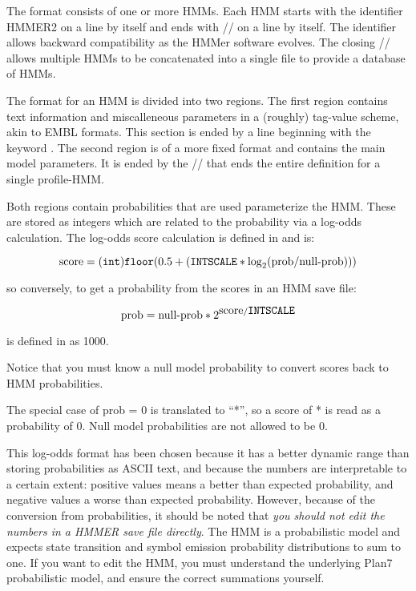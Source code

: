 The format consists of one or more HMMs. Each HMM starts with the
identifier HMMER2 on a line by itself and ends with // on a line by
itself. The identifier allows backward compatibility as the HMMer
software evolves. The closing // allows multiple HMMs to be
concatenated into a single file to provide a database of HMMs.

The format for an HMM is divided into two regions. The first region
contains text information and miscalleneous parameters in a (roughly)
tag-value scheme, akin to EMBL formats. This section is ended by a
line beginning with the keyword . The second region is of a
more fixed format and contains the main model parameters. It is ended
by the // that ends the entire definition for a single profile-HMM.

Both regions contain probabilities that are used parameterize the HMM.
These are stored as integers which are related to the probability via
a log-odds calculation. The log-odds score calculation is defined in
 and is:

\[
\mbox{score} = (\mbox{\texttt{int}}) \mbox{\texttt{floor}}(0.5 + (\mbox{\texttt{INTSCALE}} * \log_2(\mbox{prob}/\mbox{null-prob})))
\]

so conversely, to get a probability from the scores in an HMM save
file:

\[
\mbox{prob} = \mbox{null-prob} * 2^{\mbox{score}/\mbox{\texttt{INTSCALE}}}
\]

 is defined in  as 1000. 

Notice that you must know a null model probability to convert scores
back to HMM probabilities. 

The special case of prob = 0 is translated to ``*'', so a score of *
is read as a probability of 0. Null model probabilities are not
allowed to be 0.

This log-odds format has been chosen because it has a better dynamic
range than storing probabilities as ASCII text, and because the
numbers are interpretable to a certain extent: positive values means a
better than expected probability, and negative values a worse than
expected probability.  However, because of the conversion from
probabilities, it should be noted that {\em you should not edit the
numbers in a HMMER save file directly}. The HMM is a probabilistic
model and expects state transition and symbol emission probability
distributions to sum to one. If you want to edit the HMM, you must
understand the underlying Plan7 probabilistic model, and ensure the
correct summations yourself.

